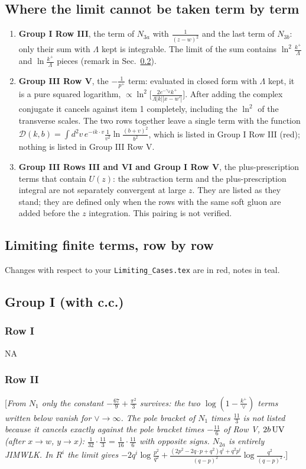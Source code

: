 \documentclass[9pt]{article}
\numberwithin{equation}{section}
\newcommand{\rnote}[1]{{\color{teal}[\textit{#1}]}}
\begin{document}
\subsection{Where the limit cannot be taken term by term}\label{sec:cannot}
\begin{enumerate}
\item \textbf{Group I Row III}, the term of $N_{3a}$ with $\frac{1}{(z-w)^{2}}$ and the last term of $N_{3b}$: only their sum with $\Lambda$ kept is integrable. The limit of the sum contains $\ln^{2}\frac{k^{+}}{\Lambda}$ and $\ln\frac{k^{+}}{\Lambda}$ pieces (remark in Sec.~\ref{sec:lim}).
\item \textbf{Group III Row V}, the $-\frac{1}{p^{+}}$ term: evaluated in closed form with $\Lambda$ kept, it is a pure squared logarithm, $\propto\ln^{2}\!\big[\frac{2e^{-\gamma_{E}}k^{+}}{\Lambda|k||x-w'|}\big]$. After adding the complex conjugate it cancels against item 1 completely, including the $\ln^{2}$ of the transverse scales. The two rows together leave a single term with the function $\mathcal{D}(k,b)=\int d^{2}v\,e^{-ik\cdot v}\frac{1}{v^{2}}\ln\frac{(b+v)^{2}}{b^{2}}$, which is listed in Group I Row III (red); nothing is listed in Group III Row V.
\item \textbf{Group III Rows III and VI and Group I Row V}, the plus-prescription terms that contain $U(z)$: the subtraction term and the plus-prescription integral are not separately convergent at large $z$. They are listed as they stand; they are defined only when the rows with the same soft gluon are added before the $z$ integration. This pairing is not verified.
\end{enumerate}

\subsection{Limiting finite terms, row by row}\label{sec:lim}
Changes with respect to your \texttt{Limiting\_Cases.tex} are in red, notes in teal.

\subsection{Group I (with c.c.)}
\subsubsection{Row I}
\textsc{NA}
\subsubsection{Row II}
\rnote{From $N_{1}$ only the constant $-\frac{67}{9}+\frac{\pi^{2}}{3}$ survives: the two $\log(1-\frac{k^{+}}{\vee})$ terms written below vanish for $\vee\to\infty$. The pole bracket of $N_{1}$ times $\frac{11}{3}$ is not listed because it cancels exactly against the pole bracket times $-\frac{11}{6}$ of Row V, $2b\,{\rm UV}$ (after $x\to w$, $y\to x$): $\frac{1}{32}\cdot\frac{11}{3}=\frac{1}{16}\cdot\frac{11}{6}$ with opposite signs. $N_{2a}$ is entirely JIMWLK. In $R^{i}$ the limit gives $-2q^{i}\log\frac{p^{2}}{q^{2}}+\frac{(2p^{2}-2q\cdot p+q^{2})q^{i}+q^{2}p^{i}}{(q-p)^{2}}\log\frac{q^{2}}{(q-p)^{2}}$.}
\end{document}
